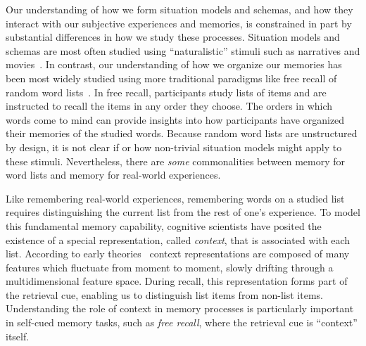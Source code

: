 \documentclass[11pt]{article}
\begin{document}

Our understanding of how we form situation models and schemas, and how they
interact with our subjective experiences and memories, is constrained in part
by substantial differences in how we study these processes. Situation models
and schemas are most often studied using ``naturalistic'' stimuli such as
narratives and movies~\citep{ZwaaEtal95,ZwaaRadv98, NastEtal20}. In contrast,
our understanding of how we organize our memories has been most widely studied
using more traditional paradigms like free recall of random word
lists~\citep{Kaha12}. In free recall, participants study lists of items and are
instructed to recall the items in any order they choose. The orders in which
words come to mind can provide insights into how participants have organized
their memories of the studied words. Because random word lists are unstructured
by design, it is not clear if or how non-trivial situation models might apply
to these stimuli. Nevertheless, there are \textit{some} commonalities between
memory for word lists and memory for real-world experiences.

Like remembering real-world experiences, remembering words on a studied list
requires distinguishing the current list from the rest of one's experience. To
model this fundamental memory capability, cognitive scientists have posited the
existence of a special representation, called \emph{context}, that is
associated with each list. According to early
theories~\citep[e.g.][]{Este55a,AndeBowe72} context representations are
composed of many features which fluctuate from moment to moment, slowly
drifting through a multidimensional feature space. During recall, this
representation forms part of the retrieval cue, enabling us to distinguish list
items from non-list items. Understanding the role of context in memory
processes is particularly important in self-cued memory tasks, such as
\textit{free recall}, where the retrieval cue is ``context'' itself.
\end{document}

